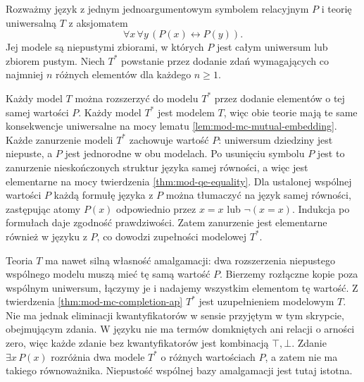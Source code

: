 \begin{przyklad}
\label{ex:mod-mc-ap-empty}
Rozważmy język z jednym jednoargumentowym symbolem
relacyjnym $P$ i teorię uniwersalną $T$ z aksjomatem
\[
\forall x\,\forall y\,(P(x)\leftrightarrow P(y)).
\]
Jej modele są niepustymi zbiorami, w których $P$
jest całym uniwersum lub zbiorem pustym.
Niech $T^*$ powstanie przez dodanie zdań
wymagających co najmniej $n$ różnych elementów
dla każdego $n\geq1$.

Każdy model $T$ można rozszerzyć do modelu $T^*$
przez dodanie elementów o tej samej wartości $P$.
Każdy model $T^*$ jest modelem $T$, więc obie teorie
mają te same konsekwencje uniwersalne na mocy lematu
\ref{lem:mod-mc-mutual-embedding}.
Każde zanurzenie modeli $T^*$ zachowuje wartość $P$:
uniwersum dziedziny jest niepuste, a $P$ jest
jednorodne w obu modelach. Po usunięciu symbolu $P$
jest to zanurzenie nieskończonych struktur języka
samej równości, a więc jest elementarne na mocy
twierdzenia \ref{thm:mod-qe-equality}.
Dla ustalonej wspólnej wartości $P$ każdą formułę
języka z $P$ można tłumaczyć na język samej równości,
zastępując atomy $P(x)$ odpowiednio przez $x=x$
lub $\neg(x=x)$. Indukcja po formułach daje zgodność
prawdziwości. Zatem zanurzenie jest elementarne
również w języku z $P$, co dowodzi zupełności
modelowej $T^*$.

Teoria $T$ ma nawet silną własność amalgamacji:
dwa rozszerzenia niepustego wspólnego modelu
muszą mieć tę samą wartość $P$.
Bierzemy rozłączne kopie poza wspólnym uniwersum,
łączymy je i nadajemy wszystkim elementom tę wartość.
Z twierdzenia \ref{thm:mod-mc-completion-ap}
$T^*$ jest uzupełnieniem modelowym $T$.
Nie ma jednak eliminacji kwantyfikatorów w sensie
przyjętym w tym skrypcie, obejmującym zdania.
W języku nie ma termów domkniętych ani relacji
o arności zero, więc każde zdanie bez kwantyfikatorów
jest kombinacją $\top,\bot$.
Zdanie $\exists x\,P(x)$ rozróżnia dwa modele $T^*$
o różnych wartościach $P$, a zatem nie ma takiego
równoważnika. Niepustość wspólnej bazy amalgamacji
jest tutaj istotna.
\end{przyklad}

